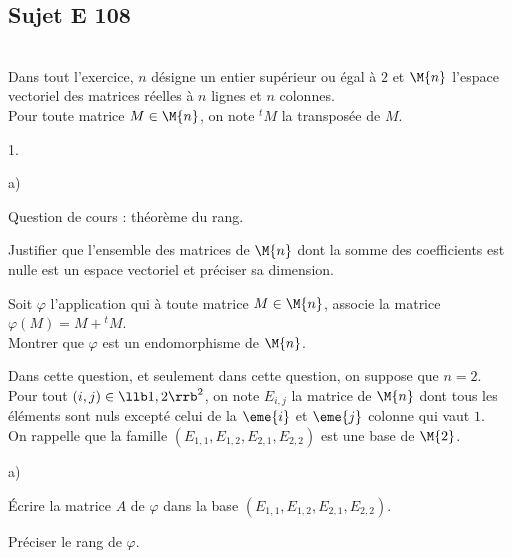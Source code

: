 \documentclass[11pt]{article}%
\begin{document}


\subsection*{Sujet E 108}


\begin{exerciceAP}~\\
  Dans tout l'exercice, $n$ désigne un entier supérieur ou égal à $2$ 
  et $\M{n}$ l'espace vectoriel des matrices réelles à $n$ lignes 
  et $n$ colonnes.\\
  Pour toute matrice $M \in \M{n}$, on note ${}^t M$ la transposée
  de $M$.
  \begin{noliste}{1.}
    \setlength{\itemsep}{2mm}
    \item 
    \begin{noliste}{a)}
    \setlength{\itemsep}{2mm}
      \item Question de cours : théorème du rang.
      \item Justifier que l'ensemble des matrices de $\M{n}$ dont la 
      somme des coefficients est nulle est un espace vectoriel 
      et préciser sa dimension.
    \end{noliste}
    
    \item Soit $\varphi$ l'application qui à toute matrice $M\in \M{n}$,
    associe la matrice $\varphi(M) = M + {}^t M$.\\
    Montrer que $\varphi$ est un endomorphisme de $\M{n}$.
    
    \item Dans cette question, et seulement dans cette question, on 
    suppose que $n=2$.\\
    Pour tout $(i,j) \in \llb 1,2 \rrb^2$, on note $E_{i,j}$ la 
    matrice de $\M{n}$ dont tous les éléments sont nuls excepté celui
    de la $\eme{i}$ et $\eme{j}$ colonne qui vaut $1$.\\
    On rappelle que la famille $(E_{1,1}, E_{1,2}, E_{2,1}, E_{2,2})$
    est une base de $\M{2}$.
    \begin{noliste}{a)}
    \setlength{\itemsep}{2mm}
      \item Écrire la matrice $A$ de $\varphi$ dans la base $(E_{1,1},
      E_{1,2}, E_{2,1}, E_{2,2})$.
      
      \item Préciser le rang de $\varphi$.
      

\end{noliste}
\end{noliste}
\end{exerciceAP}
\end{document}
